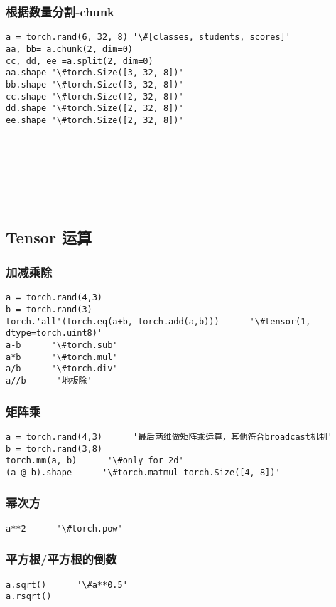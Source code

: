 \subsubsection{根据数量分割-chunk}
\begin{lstlisting}
a = torch.rand(6, 32, 8) '\#[classes, students, scores]'
aa, bb= a.chunk(2, dim=0)
cc, dd, ee =a.split(2, dim=0)
aa.shape '\#torch.Size([3, 32, 8])'
bb.shape '\#torch.Size([3, 32, 8])'
cc.shape '\#torch.Size([2, 32, 8])'
dd.shape '\#torch.Size([2, 32, 8])'
ee.shape '\#torch.Size([2, 32, 8])'
\end{lstlisting}
~\\
~\\
~\\
~\\
~\\


\subsection{Tensor 运算}
\subsubsection{加减乘除}
\begin{lstlisting}
a = torch.rand(4,3)
b = torch.rand(3)
torch.'all'(torch.eq(a+b, torch.add(a,b)))      '\#tensor(1, dtype=torch.uint8)'
a-b      '\#torch.sub'
a*b      '\#torch.mul'
a/b      '\#torch.div'
a//b      '地板除'
\end{lstlisting}

\subsubsection{矩阵乘}
\begin{lstlisting}
a = torch.rand(4,3)      '最后两维做矩阵乘运算，其他符合broadcast机制'
b = torch.rand(3,8)
torch.mm(a, b)      '\#only for 2d'
(a @ b).shape      '\#torch.matmul torch.Size([4, 8])'
\end{lstlisting}

\subsubsection{幂次方}
\begin{lstlisting}
a**2      '\#torch.pow'
\end{lstlisting}

\subsubsection{平方根/平方根的倒数}
\begin{lstlisting}
a.sqrt()      '\#a**0.5'
a.rsqrt()
\end{lstlisting}

